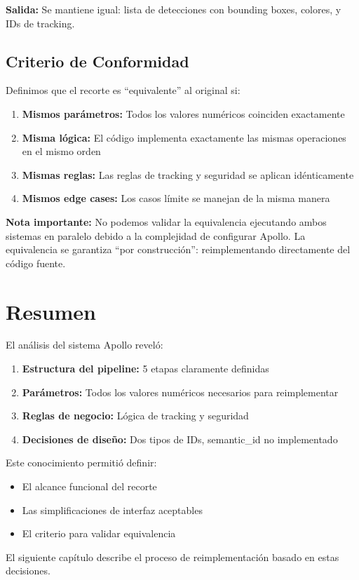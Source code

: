 \textbf{Salida:} Se mantiene igual: lista de detecciones con bounding boxes, colores, y IDs de tracking.

\subsection{Criterio de Conformidad}

Definimos que el recorte es ``equivalente'' al original si:

\begin{enumerate}
    \item \textbf{Mismos parámetros:} Todos los valores numéricos coinciden exactamente
    \item \textbf{Misma lógica:} El código implementa exactamente las mismas operaciones en el mismo orden
    \item \textbf{Mismas reglas:} Las reglas de tracking y seguridad se aplican idénticamente
    \item \textbf{Mismos edge cases:} Los casos límite se manejan de la misma manera
\end{enumerate}

\textbf{Nota importante:} No podemos validar la equivalencia ejecutando ambos sistemas en paralelo debido a la complejidad de configurar Apollo. La equivalencia se garantiza ``por construcción'': reimplementando directamente del código fuente.

\section{Resumen}

El análisis del sistema Apollo reveló:

\begin{enumerate}
    \item \textbf{Estructura del pipeline:} 5 etapas claramente definidas
    \item \textbf{Parámetros:} Todos los valores numéricos necesarios para reimplementar
    \item \textbf{Reglas de negocio:} Lógica de tracking y seguridad
    \item \textbf{Decisiones de diseño:} Dos tipos de IDs, semantic\_id no implementado
\end{enumerate}

Este conocimiento permitió definir:

\begin{itemize}
    \item El alcance funcional del recorte
    \item Las simplificaciones de interfaz aceptables
    \item El criterio para validar equivalencia
\end{itemize}

El siguiente capítulo describe el proceso de reimplementación basado en estas decisiones.
